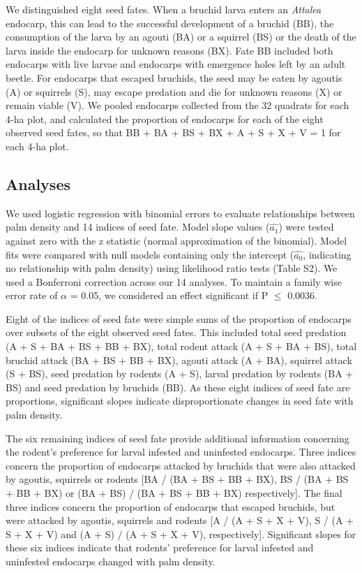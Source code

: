 \documentclass[b5paper,justified]{tufte-book} %
\begin{document}
\begin{fullwidth}
We distinguished eight seed fates. When a bruchid larva enters an \textit{Attalea} endocarp, this can lead to the successful development of a bruchid (BB), the consumption of the larva by an agouti (BA) or a
squirrel (BS) or the death of the larva inside the endocarp for unknown reasons (BX). Fate BB included both endocarps with live larvae and endocarps with emergence holes left by an adult beetle. For endocarps that escaped bruchids, the seed may be eaten by agoutis (A) or squirrels (S), may escape predation and die for unknown reasons (X) or remain viable (V). We pooled endocarps collected from the 32 quadrats for each 4-ha plot, and calculated the proportion of
endocarps for each of the eight observed seed fates, so that BB + BA + BS + BX + A + S + X + V = 1 for each 4-ha plot.

\subsection{Analyses}
We used logistic regression with binomial errors to evaluate relationships between palm density and 14 indices of seed fate. Model slope values ($\hat{a_1}$) were tested against zero with the z statistic (normal approximation of the binomial). Model fits were compared with null models containing only the intercept ($\hat{a_0}$, indicating no
relationship with palm density) using likelihood ratio tests (Table S2). We used a Bonferroni correction across our 14 analyses. To maintain a family wise error rate of $\alpha$ = 0.05, we considered an effect significant
if P $\leq$ 0.0036.

Eight of the indices of seed fate were simple sums of the proportion of endocarps over subsets of the eight observed seed fates. This included total seed predation (A + S + BA + BS + BB + BX), total rodent attack (A + S + BA + BS), total bruchid attack (BA + BS + BB + BX), agouti attack (A + BA), squirrel attack (S + BS), seed predation by rodents (A + S), larval predation by rodents (BA + BS) and seed predation by bruchids (BB). As these eight indices of seed
fate are proportions, significant slopes indicate disproportionate changes in seed fate with palm density.

The six remaining indices of seed fate provide additional information concerning the rodent's preference for larval infested and uninfested endocarps. Three indices concern the proportion of endocarps attacked by bruchids that were also attacked by agoutis, squirrels or rodents [BA / (BA + BS + BB + BX), BS / (BA + BS + BB + BX) or (BA + BS) / (BA + BS + BB + BX) respectively]. The final three indices concern the proportion of endocarps that escaped bruchids, but were attacked by agoutis, squirrels and rodents [A / (A + S + X + V), S / (A + S + X + V) and (A + S) / (A + S +
X + V), respectively]. Significant slopes for these six indices indicate that rodents' preference for larval infested and uninfested endocarps changed with palm density.


\end{fullwidth}
\end{document}
